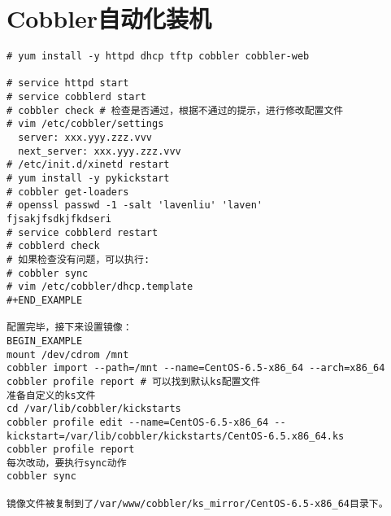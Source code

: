 \chapter{Cobbler自动化装机}
\label{chap:cobbler}

\begin{verbatim}
# yum install -y httpd dhcp tftp cobbler cobbler-web

# service httpd start
# service cobblerd start
# cobbler check # 检查是否通过，根据不通过的提示，进行修改配置文件
# vim /etc/cobbler/settings
  server: xxx.yyy.zzz.vvv
  next_server: xxx.yyy.zzz.vvv
# /etc/init.d/xinetd restart
# yum install -y pykickstart
# cobbler get-loaders
# openssl passwd -1 -salt 'lavenliu' 'laven'
fjsakjfsdkjfkdseri
# service cobblerd restart
# cobblerd check
# 如果检查没有问题，可以执行:
# cobbler sync
# vim /etc/cobbler/dhcp.template
#+END_EXAMPLE

配置完毕，接下来设置镜像：
BEGIN_EXAMPLE
mount /dev/cdrom /mnt
cobbler import --path=/mnt --name=CentOS-6.5-x86_64 --arch=x86_64
cobbler profile report # 可以找到默认ks配置文件
准备自定义的ks文件
cd /var/lib/cobbler/kickstarts
cobbler profile edit --name=CentOS-6.5-x86_64 --kickstart=/var/lib/cobbler/kickstarts/CentOS-6.5.x86_64.ks
cobbler profile report
每次改动，要执行sync动作
cobbler sync
  
镜像文件被复制到了/var/www/cobbler/ks_mirror/CentOS-6.5-x86_64目录下。
\end{verbatim}

